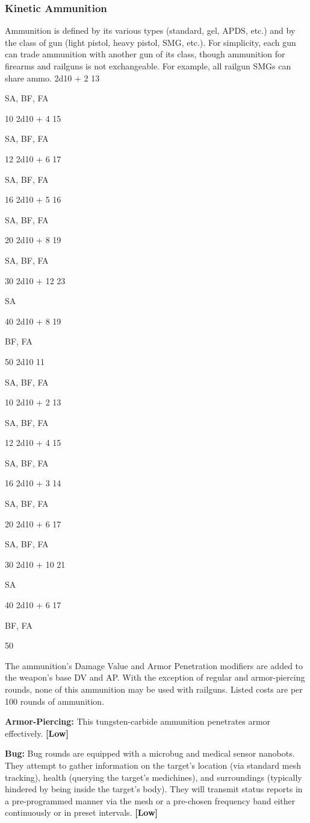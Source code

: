 \subsubsection{Kinetic Ammunition}

Ammunition is defined by its various types (standard, 
gel, APDS, etc.) and by the class of gun (light pistol, 
heavy pistol, SMG, etc.). For simplicity, each gun 
can trade ammunition with another gun of its class, 
though ammunition for firearms and railguns is not 
exchangeable. For example, all railgun SMGs can 
share ammo.
2d10 + 2
13

SA, BF, FA

10
2d10 + 4
15

SA, BF, FA

12
2d10 + 6
17

SA, BF, FA

16
2d10 + 5
16

SA, BF, FA

20
2d10 + 8
19

SA, BF, FA

30
2d10 + 12
23

SA

40
2d10 + 8
19

BF, FA

50
2d10
11

SA, BF, FA

10
2d10 + 2
13

SA, BF, FA

12
2d10 + 4
15

SA, BF, FA

16
2d10 + 3
14

SA, BF, FA

20
2d10 + 6
17

SA, BF, FA

30
2d10 + 10
21

SA

40
2d10 + 6
17

BF, FA

50

The ammunition's Damage Value and Armor Penetration
modifiers are added to the weapon's base
DV and AP. With the exception of regular and armor-piercing
rounds, none of this ammunition may be
used with railguns. Listed costs are per 100 rounds 
of ammunition.

\textbf{Armor-Piercing: }This tungsten-carbide ammunition 
penetrates armor effectively. \textbf{[Low]}

\textbf{Bug: }Bug rounds are equipped with a microbug and 
medical sensor nanobots. They attempt to gather information
on the target's location (via standard mesh
tracking), health (querying the target's medichines), 
and surroundings (typically hindered by being inside 
the target's body). They will transmit status reports 
in a pre-programmed manner via the mesh or a pre-chosen
frequency band either continuously or in preset
intervals. \textbf{[Low]}

